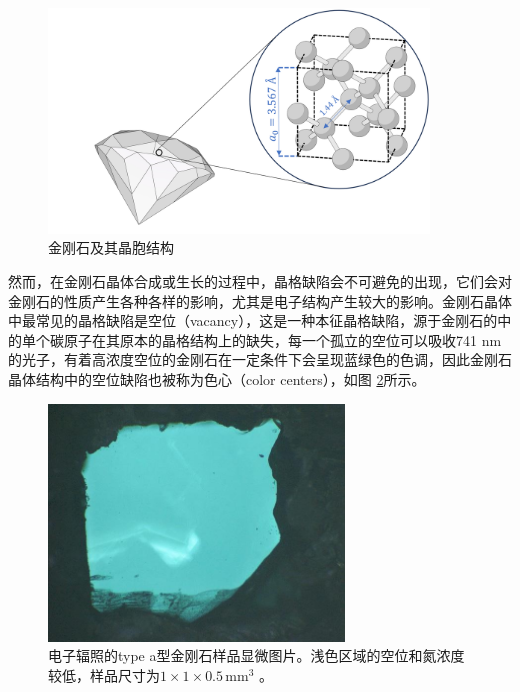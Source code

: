 \documentclass[type = bachelor, oneside]{whu-thesis}
\begin{document}
\begin{figure}[h]
  \centering
  \includegraphics[width=0.9\textwidth]{figures/Chapter 2/Diamond Lattice.png}
  \caption[金刚石及其晶胞结构]{金刚石及其晶胞结构\cite{Staudacher2015}}
  \label{fig: Diamond Lattice}
\end{figure}

然而，在金刚石晶体合成或生长的过程中，晶格缺陷会不可避免的出现，它们会对金刚石的性质产生各种各样的影响，尤其是电子结构产生较大的影响\cite{Jelezko2006, Nebel2003}。金刚石晶体中最常见的晶格缺陷是空位（vacancy），这是一种本征晶格缺陷，源于金刚石的中的单个碳原子在其原本的晶格结构上的缺失，每一个孤立的空位可以吸收741 nm的光子，有着高浓度空位的金刚石在一定条件下会呈现蓝绿色的色调，因此金刚石晶体结构中的空位缺陷也被称为色心（color centers），如图 \ref{fig: Color Center}所示\cite{Waldermann2007, Kiflawi2007}。

\begin{figure}
  \centering
  \includegraphics[width=0.7\textwidth]{figures/Chapter 2/Color Center.jpg}
  \caption[电子辐照的type \uppercase\expandafter{}a型金刚石样品显微图片]{电子辐照的type \uppercase\expandafter{}a型金刚石样品显微图片。浅色区域的空位和氮浓度较低，样品尺寸为\(1\times1\times0.5 \, \mathrm{mm^3}\) \cite{Kiflawi2007}。}
  \label{fig: Color Center}
\end{figure}
\end{document}
